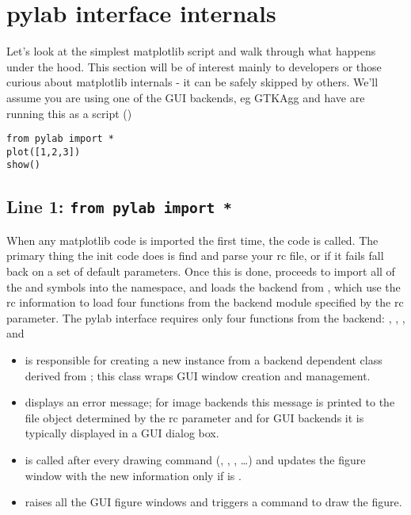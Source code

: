 \documentclass[twoside]{book}
\begin{document}
\section{pylab interface internals}

Let's look at the simplest matplotlib script and walk through what
happens under the hood.  This section will be of interest mainly to
developers or those curious about matplotlib internals - it can be
safely skipped by others.  We'll assume you are using one of the GUI
backends, eg GTKAgg and have are running this as a script
()

\begin{lstlisting}                    
from pylab import *       
plot([1,2,3])
show()
\end{lstlisting}

\subsection*{Line 1: \texttt{from pylab import *}}

When any matplotlib code is imported the first time, the
 code is called.  The primary thing
the init code does is find and parse your rc file, or if it fails fall
back on a set of default parameters.  Once this is done,
 proceeds to import all of the
 and  symbols into
the namespace, and loads the backend from
, which use the rc information to load
four functions from the backend module specified by the rc
 parameter.  The pylab interface requires only four
functions from the backend: ,
, , and 

\begin{itemize}
  
\item {} is responsible for creating a new
  instance from a backend dependent class derived from
  ; this class wraps
  GUI window creation and management.
  
\item {} displays an error message; for image backends
  this message is printed to the file object determined by the rc
  parameter  and for GUI backends it is typically
  displayed in a GUI dialog box.

\item {} is called after every
   drawing command (, ,
  , \dots) and updates the figure window with the new
  information only if  is .

\item {} raises all the GUI figure windows and triggers a
  command to draw the figure.

\end{itemize}
\end{document}
